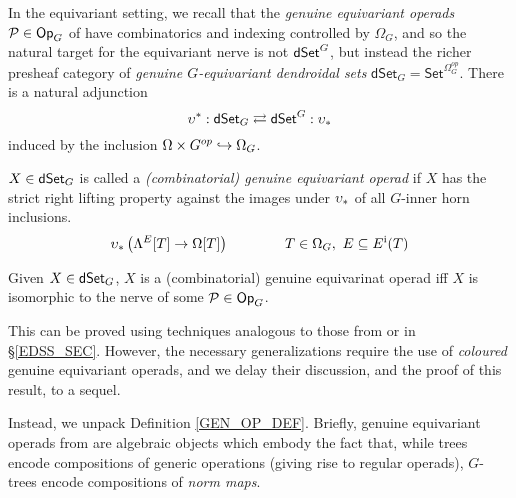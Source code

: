\documentclass[a4paper,10pt
,draft
]{article}%
\begin{document}
In the equivariant setting,
we recall that the 
\textit{genuine equivariant operads} $\mathcal{P} \in \mathsf{Op}_G$ of \cite{BP17}
have combinatorics and indexing controlled by $\Omega_G$,
and so the natural target for the equivariant nerve is not $\mathsf{dSet}^G$, but instead the richer presheaf category of
\textit{genuine $G$-equivariant dendroidal sets} $\mathsf{dSet}_G = \mathsf{Set}^{\Omega_G^{op}}$.
There is a natural adjunction
\begin{equation}
      \label{DSETG_EQ}
      \upsilon^{\**}: \dSet_G \rightleftarrows \dSet^G : \upsilon_{\**}
\end{equation}
induced by the inclusion $\Omega \times G^{op} \hookrightarrow \Omega_G$.
\begin{definition}
      \label{GEN_OP_DEF}
      $X \in \mathsf{dSet}_G$ is called a \textit{(combinatorial) genuine equivariant operad} if
      $X$ has the strict right lifting property against the images under $\upsilon_{\**}$
      of all $G$-inner horn inclusions.
      \begin{equation}
            \label{GGIOP_EQ}
            \upsilon_{\**}\left( \Lambda^{E}[T] \to \Omega[T] \right)
            \qquad \qquad
            T \in \Omega_G,\ E \subseteq E^{\mathrm{i}}(T)
      \end{equation}
\end{definition}

\begin{proposition}
      Given $X \in \mathsf{dSet}_G$, $X$ is a (combinatorial) genuine equivarinat operad
      iff
      $X$ is isomorphic to the nerve of some $\mathcal{P} \in \mathsf{Op}_G$.
\end{proposition}

This can be proved using techniques analogous to those from \cite[Theorem 6.1]{MW09} or in \S \ref{EDSS_SEC}.
However, the necessary generalizations require the use of \textit{coloured} genuine equivariant operads,
and we delay their discussion, and the proof of this result, to a sequel.

Instead, we unpack Definition \ref{GEN_OP_DEF}. %
Briefly, genuine equivariant operads from \cite{BP17} are algebraic objects
which embody the fact that,
while trees encode compositions of generic operations (giving rise to regular operads),
$G$-trees encode compositions of \textit{norm maps}.
\end{document}
